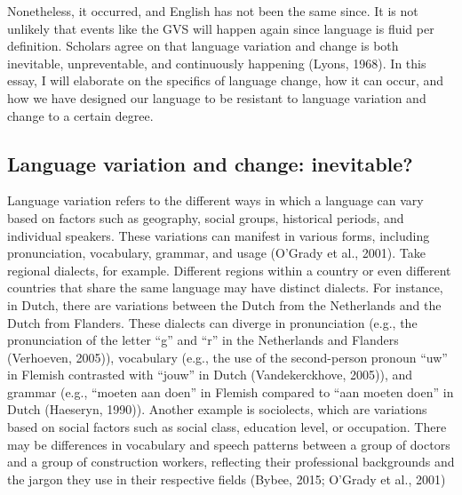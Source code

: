 Nonetheless, it occurred, and English has not been the same since. It is not unlikely that events like the GVS will happen again since language is fluid per definition. Scholars agree on that language variation and change is both inevitable, unpreventable, and continuously happening (Lyons, 1968). In this essay, I will elaborate on the specifics of language change, how it can occur, and how we have designed our language to be resistant to language variation and change to a certain degree. 


\subsection{Language variation and change: inevitable?}

Language variation refers to the different ways in which a language can vary based on factors such as geography, social groups, historical periods, and individual speakers. These variations can manifest in various forms, including pronunciation, vocabulary, grammar, and usage (O’Grady et al., 2001). Take regional dialects, for example. Different regions within a country or even different countries that share the same language may have distinct dialects. For instance, in Dutch, there are variations between the Dutch from the Netherlands and the Dutch from Flanders. These dialects can diverge in pronunciation (e.g., the pronunciation of the letter “g” and “r” in the Netherlands and Flanders (Verhoeven, 2005)), vocabulary (e.g., the use of the second-person pronoun “uw” in Flemish contrasted with “jouw” in Dutch (Vandekerckhove, 2005)), and grammar (e.g., “moeten aan doen” in Flemish compared to “aan moeten doen” in Dutch (Haeseryn, 1990)). Another example is sociolects, which are variations based on social factors such as social class, education level, or occupation. There may be differences in vocabulary and speech patterns between a group of doctors and a group of construction workers, reflecting their professional backgrounds and the jargon they use in their respective fields (Bybee, 2015; O’Grady et al., 2001) 

